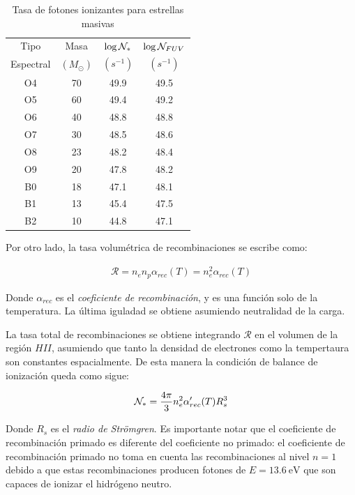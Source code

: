 \begin{table}
  \begin{tabular}{cccc} \hline 
    Tipo & Masa & $\log \mathcal{N}_*$ & $\log \mathcal{N}_{FUV}$ \\
    Espectral & $(M_\odot)$ & $(s^{-1})$ & $(s^{-1})$  \\
    \hline
    O4 & 70 & 49.9 & 49.5 \\
    O5 & 60 & 49.4 & 49.2 \\
    O6 & 40 & 48.8 & 48.8 \\
    O7 & 30 & 48.5 & 48.6 \\
    O8 & 23 & 48.2 & 48.4 \\
    O9 & 20 & 47.8 & 48.2 \\
    B0 & 18 & 47.1 & 48.1 \\
    B1 & 13 & 45.4 & 47.5 \\
    B2 & 10 & 44.8 & 47.1 \\
    \hline
  \end{tabular}
  \caption{Tasa de fotones ionizantes para estrellas masivas \citep{Stahler:2004}}
  \label{tab:ionizing-radiation}
\end{table}

Por otro lado, la tasa volumétrica de recombinaciones se escribe como:

\begin{align}
  \ensuremath{\mathcal{R}} = n_e n_p \alpha_{rec}(T) = n^2_e \alpha_{rec}(T)
\end{align}

Donde $\alpha_{rec}$ es el \textit{coeficiente de recombinación}, y es una función solo de la temperatura. La última iguladad se obtiene asumiendo neutralidad de la carga.

La tasa total de recombinaciones se obtiene integrando $\ensuremath{\mathcal{R}}$ en el volumen de la región $HII$, asumiendo que tanto la densidad de electrones como la tempertaura son constantes espacialmente. De esta manera la condición de balance de ionización queda como sigue:

\begin{align}
  \mathcal{N}_* = \frac{4\pi}{3} n^2_e \alpha'_{rec}(T)R^3_s 
\end{align}

Donde $R_s$ es el \textit{radio de Strömgren}. Es importante notar que el coeficiente de recombinación primado es diferente del coeficiente no primado: el coeficiente de recombinación primado no toma en cuenta las recombinaciones al nivel $n = 1$ debido a que estas recombinaciones producen fotones de $E = 13.6\mathrm{~eV}$ que son capaces de ionizar el hidrógeno neutro.

